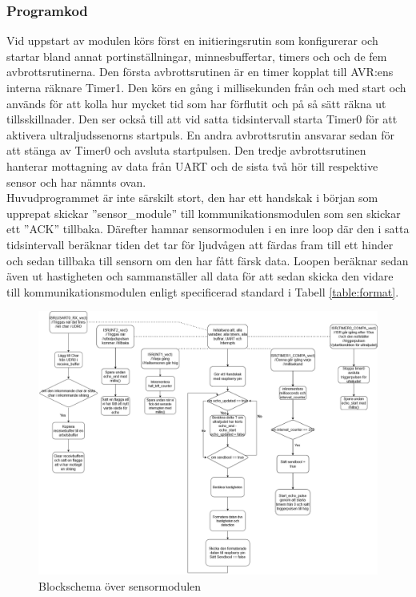 \documentclass[10pt,oneside,swedish]{lips}
\begin{document}
\subsubsection{Programkod}

Vid uppstart av modulen körs först en initieringsrutin som konfigurerar och startar bland annat portinställningar, minnesbuffertar, timers och och de fem avbrottsrutinerna. Den första avbrottsrutinen är en timer kopplat till AVR:ens interna räknare Timer1. Den körs en gång i millisekunden från och med start och används för att kolla hur mycket tid som har förflutit och på så sätt räkna ut tillsskillnader. Den ser också till att vid satta tidsintervall starta Timer0 för att aktivera ultraljudssenorns startpuls. En andra avbrottsrutin ansvarar sedan för att stänga av Timer0 och avsluta startpulsen.
Den tredje avbrottsrutinen hanterar mottagning av data från UART och de sista två hör till respektive sensor och har nämnts ovan.\\

\noindent
Huvudprogrammet är inte särskilt stort, den har ett handskak i början som upprepat skickar ''sensor\_module'' till kommunikationsmodulen som sen skickar ett ''ACK'' tillbaka. Därefter hamnar sensormodulen i en inre loop där den i satta tidsintervall beräknar tiden det tar för ljudvågen att färdas fram till ett hinder och sedan tillbaka till sensorn om den har fått färsk data. Loopen beräknar sedan även ut hastigheten och sammanställer all data för att sedan skicka den vidare till kommunikationsmodulen enligt specificerad standard i Tabell \ref{table:format}.

\begin{figure}[H]%
  \centering
  \includegraphics[width=1\textwidth]{./Figures/Sensormodule_blockschema.png}
  \caption{Blockschema över sensormodulen}
  \label{fig:sensor-blockschema}
\end{figure}
\end{document}
